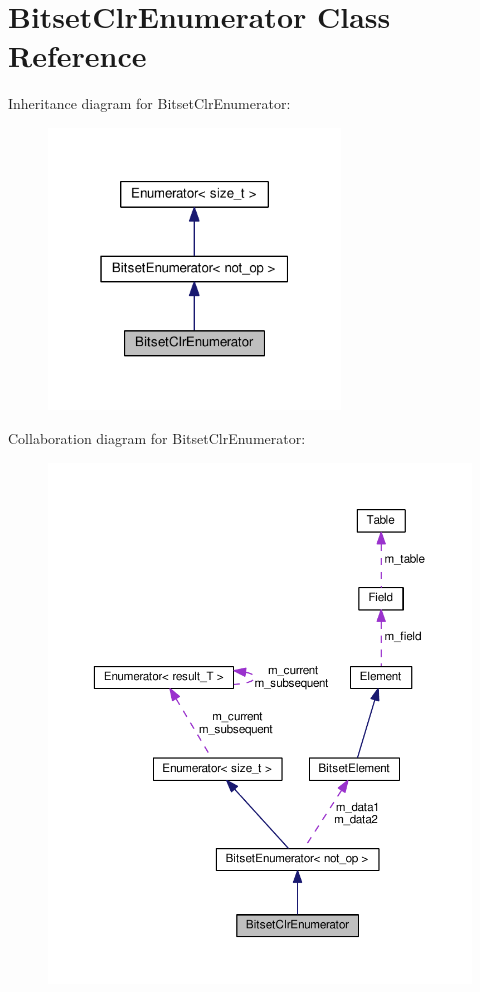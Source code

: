 \hypertarget{classBitsetClrEnumerator}{}\section{Bitset\+Clr\+Enumerator Class Reference}
\label{classBitsetClrEnumerator}


Inheritance diagram for Bitset\+Clr\+Enumerator\+:\nopagebreak
\begin{figure}[H]
\begin{center}
\leavevmode
\includegraphics[width=220pt]{classBitsetClrEnumerator__inherit__graph}
\end{center}
\end{figure}


Collaboration diagram for Bitset\+Clr\+Enumerator\+:\nopagebreak
\begin{figure}[H]
\begin{center}
\leavevmode
\includegraphics[width=350pt]{classBitsetClrEnumerator__coll__graph}
\end{center}
\end{figure}
